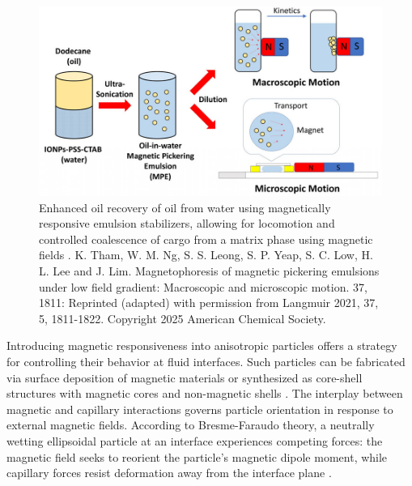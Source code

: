 \begin{figure}
    \centering
    \includegraphics[scale = 1.5]{figures/introduction/magnetophoresis_emulsion.jpeg}
    \caption{Enhanced oil recovery of oil from water using magnetically responsive emulsion stabilizers, allowing for 
             locomotion and controlled coalescence of cargo from a matrix phase using magnetic fields \cite{tham_magnetophoresis_2021}. 
             K. Tham, W. M. Ng, S. S. Leong, S. P. Yeap, S. C. Low, H. L. Lee and J. Lim. Magnetophoresis of magnetic pickering 
             emulsions under low field gradient: Macroscopic and microscopic motion. 37, 1811: Reprinted (adapted) with permission from 
             Langmuir 2021, 37, 5, 1811-1822. Copyright 2025 American Chemical Society.}
    \label{fig:magnetophoresis_droplet}
\end{figure}

Introducing magnetic responsiveness into anisotropic particles offers a strategy for controlling their behavior at fluid interfaces. Such particles can be fabricated via surface deposition of 
magnetic materials or synthesized as core-shell structures with magnetic cores and non-magnetic shells \cite{fei_magneto-capillary_2020, nakayama_stimuli-responsive_2018}. The interplay between magnetic 
and capillary interactions governs particle orientation in response to external magnetic fields. According to Bresme-Faraudo theory, a neutrally wetting ellipsoidal particle at an interface experiences 
competing forces: the magnetic field seeks to reorient the particle's magnetic dipole moment, while capillary forces resist deformation away from the interface plane 
\cite{bresme_orientational_2007, davies_interface_2014}.

